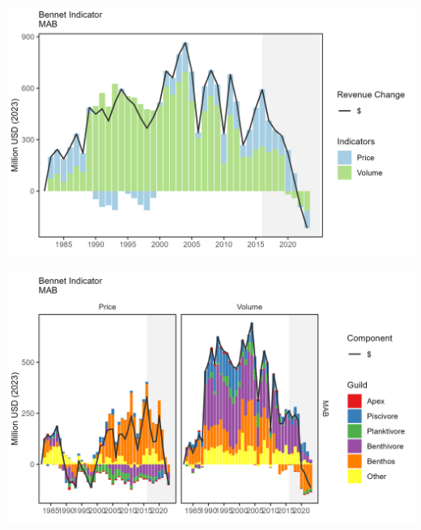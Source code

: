 \documentclass[
  10pt,
]{article}
\let\origfigure\figure
\let\endorigfigure\endfigure
\renewenvironment{figure}[1][2] {
    \expandafter\origfigure\expandafter[H]
} {
    \endorigfigure
}
\begin{document}
\begin{figure}

{\centering \includegraphics[width=6.5in]{images/MidAtlantic/bennet_MidAtlantic_2025-09-05} 

}

\caption{Revenue change from 1982 values in 2023 dollars (black); Price (PI), and Volume Indicators (VI) for total commercial landings in the Mid-Atlantic Bight.}\label{fig:bennet}
\end{figure}

\begin{figure}

{\centering \includegraphics[width=6.5in]{images/MidAtlantic/bennet_all_MidAtlantic_2025-09-05} 

}

\caption{Total price and volume indicators in 2023 dollars (black) for commercial landings, and individual guild contributions to each indicator, in the Mid-Atlantic Bight.}\label{fig:bennet-all}
\end{figure}
\end{document}
